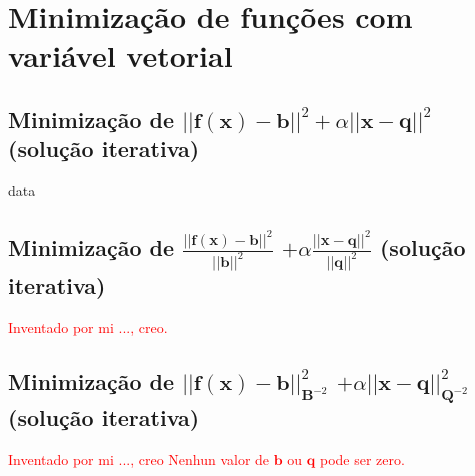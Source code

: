 
\chapter{Minimização de funções com variável vetorial}

\section{Minimização de $||\mathbf{f}(\mathbf{x})-\mathbf{b}||^2+\alpha||\mathbf{x}-\mathbf{q}||^2$  
(solução iterativa)
}

data
\section{Minimização de $\frac{||\mathbf{f}(\mathbf{x})-\mathbf{b}||^2}{||\mathbf{b}||^2}$
$+\alpha\frac{||\mathbf{x}-\mathbf{q}||^2}{||\mathbf{q}||^2}$  
(solução iterativa)
}

\textcolor{red}{Inventado por mi ..., creo.}

\section{Minimização de $||\mathbf{f}(\mathbf{x})-\mathbf{b}||_{\mathbf{B}^{-2}}^2$
$+\alpha||\mathbf{x}-\mathbf{q}||_{\mathbf{Q}^{-2}}^2$  
(solução iterativa)
}

\textcolor{red}{Inventado por mi ..., creo Nenhun valor de $\mathbf{b}$ ou $\mathbf{q}$ pode ser zero.}


